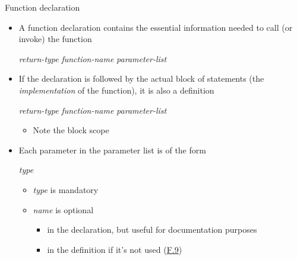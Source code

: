 \begin{frame}[fragile]{Function declaration}

  \begin{itemize}[<+->]
  \item A function \alert{declaration} contains the essential information needed
    to call (or invoke) the function

    \textit{return-type} \textit{function-name} \code{(} \textit{parameter-list} \code{);}

  \item If the declaration is followed by the actual block of statements (the
    \textit{implementation} of the function), it is also a \alert{definition}

    \textit{return-type} \textit{function-name} \code{(} \textit{parameter-list} \code{) \{ \ddd{} \}}

    \begin{itemize}
    \item Note the block scope
    \end{itemize}

  \item Each parameter in the parameter list is of the form

    \textit{type }

    \begin{itemize}
    \item \textit{type} is mandatory
    \item \textit{name} is optional
      \begin{itemize}
      \item in the declaration, but useful for documentation purposes
      \item in the definition if it's not used
        (\href{https://isocpp.github.io/CppCoreGuidelines/CppCoreGuidelines#f9-unused-parameters-should-be-unnamed}{F.9})
      \end{itemize}

    \end{itemize}
    

  \end{itemize}
\end{frame}


